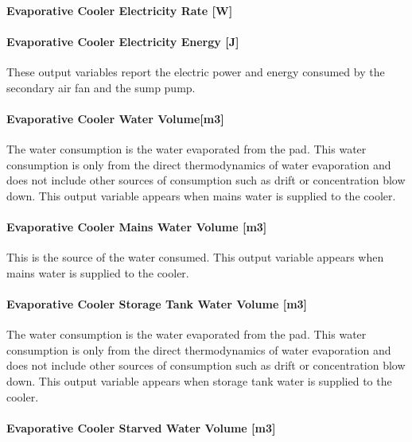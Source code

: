 \paragraph{Evaporative Cooler Electricity Rate {[}W{]}}\label{evaporative-cooler-electric-powerw-2}

\paragraph{Evaporative Cooler Electricity Energy {[}J{]}}\label{evaporative-cooler-electric-energy-j-2}

These output variables report the electric power and energy consumed by the secondary air fan and the sump pump.

\paragraph{Evaporative Cooler Water Volume{[}m3{]}}\label{evaporative-cooler-water-volumem3}

The water consumption is the water evaporated from the pad. This water consumption is only from the direct thermodynamics of water evaporation and does not include other sources of consumption such as drift or concentration blow down. This output variable appears when mains water is supplied to the cooler.

\paragraph{Evaporative Cooler Mains Water Volume {[}m3{]}}\label{evaporative-cooler-mains-water-volume-m3-2}

This is the source of the water consumed. This output variable appears when mains water is supplied to the cooler.

\paragraph{Evaporative Cooler Storage Tank Water Volume {[}m3{]}}\label{evaporative-cooler-storage-tank-water-volume-m3-2}

The water consumption is the water evaporated from the pad. This water consumption is only from the direct thermodynamics of water evaporation and does not include other sources of consumption such as drift or concentration blow down. This output variable appears when storage tank water is supplied to the cooler.

\paragraph{Evaporative Cooler Starved Water Volume {[}m3{]}}\label{evaporative-cooler-starved-water-volume-m3-2}

